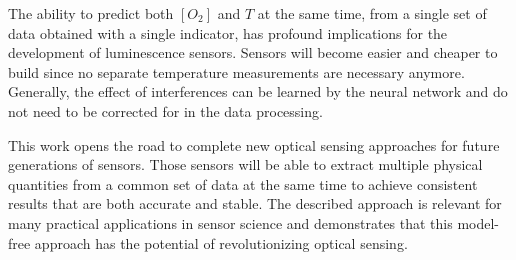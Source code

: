 \documentclass[sensors,article,submit,moreauthors,pdftex,10pt,a4paper]{Definitions/mdpi}
\begin{document}
The ability to predict both $[O_2]$ and $T$ at the same time, from a single set of data obtained with a single indicator, has profound implications for the development of luminescence sensors. Sensors will become easier and cheaper to build since no separate temperature measurements are necessary anymore. Generally, the effect of interferences can be learned by the neural network and do not need to be corrected for in the data processing. 

This work opens the road to complete new optical sensing approaches for future generations of sensors. Those sensors will be able to extract multiple physical quantities from a common set of data at the same time to achieve consistent results that are both accurate and stable. The described approach is relevant for many practical applications in sensor science and demonstrates that this model-free approach has the potential of revolutionizing optical sensing.




\vspace{6pt} 






\end{document}
